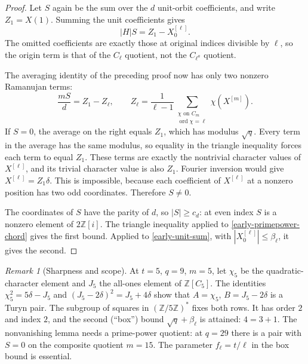 \documentclass[11pt]{article}
\theoremstyle{definition}
\theoremstyle{remark}
\newtheorem{remark}[theorem]{Remark}
\begin{document}
\begin{proof}
Let $S$ again be the sum over the $d$ unit-orbit coefficients, and write
$Z_1=X(1)$. Summing the unit coefficients gives
\begin{equation}
 |H|S=Z_1-X^{[\ell]}_0.
 \label{early-unit-sum}
\end{equation}
The omitted coefficients are exactly those at original indices divisible
by $\ell$, so the origin term is that of the $C_\ell$ quotient, not the
$C_{\ell^a}$ quotient.

The averaging identity of the preceding proof now has only two nonzero
Ramanujan terms:
\begin{equation}
 \frac{mS}{d}=Z_1-Z_\ell,
 \qquad
 Z_\ell=\frac1{\ell-1}\sum_{\substack{\chi\text{ on }C_m\\
                                    \operatorname{ord}\chi=\ell}}
                                    \chi(X^{[m]}).
 \label{early-primepower-chord}
\end{equation}
If $S=0$, the average on the right equals $Z_1$, which has modulus
$\sqrt q$. Every term in the average has the same modulus, so equality in
the triangle inequality forces each term to equal $Z_1$. These terms are
exactly the nontrivial character values of $X^{[\ell]}$, and its trivial
character value is also $Z_1$. Fourier inversion would give
$X^{[\ell]}=Z_1\delta$. This is impossible, because each coefficient of
$X^{[\ell]}$ at a nonzero position has two odd coordinates. Therefore
$S\ne0$.

The coordinates of $S$ have the parity of $d$, so $|S|\geq c_d$: at even
index $S$ is a nonzero element of $2\mathbb Z[i]$. The triangle inequality
applied to \eqref{early-primepower-chord} gives the first bound. Applied
to \eqref{early-unit-sum}, with $|X^{[\ell]}_0|\leq\beta_\ell$, it gives
the second.
\end{proof}

\begin{remark}[Sharpness and scope]
\label{early-t2-boundary}
At $t=5$, $q=9$, $m=5$, let $\chi_5$ be the quadratic-character element
and $J_5$ the all-ones element of $\mathbb Z[C_5]$. The identities
$\chi_5^2=5\delta-J_5$ and $(J_5-2\delta)^2=J_5+4\delta$ show that
$A=\chi_5$, $B=J_5-2\delta$ is a Turyn pair. The subgroup of squares in
$(\mathbb Z/5\mathbb Z)^*$ fixes both rows. It has order $2$ and index
$2$, and the second (``box'') bound $\sqrt q+\beta_\ell$ is attained:
$4=3+1$. The nonvanishing lemma needs a prime-power quotient: at $q=29$
there is a pair with $S=0$ on the composite quotient $m=15$. The
parameter $f_\ell=t/\ell$ in the box bound is essential.
\end{remark}
\end{document}
